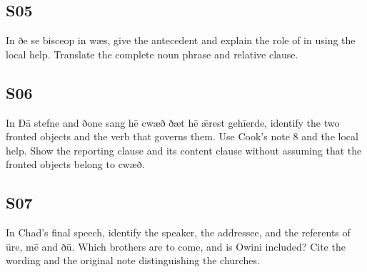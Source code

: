 \par\begin{minipage}{\linewidth}\raggedright
\subsection*{S05}

In ðe se bisceop in wæs, give the antecedent and explain the role of in using the local help. Translate the complete noun phrase and relative clause.

\end{minipage}\par\addvspace{4pt}

\par\begin{minipage}{\linewidth}\raggedright
\subsection*{S06}

In Ðā stefne and ðone sang hē cwæð ðæt hē ǣrest gehīerde, identify the two fronted objects and the verb that governs them. Use Cook’s note 8 and the local help. Show the reporting clause and its content clause without assuming that the fronted objects belong to cwæð.

\end{minipage}\par\addvspace{4pt}

\par\begin{minipage}{\linewidth}\raggedright
\subsection*{S07}

In Chad’s final speech, identify the speaker, the addressee, and the referents of ūre, mē and ðū. Which brothers are to come, and is Owini included? Cite the wording and the original note distinguishing the churches.

\end{minipage}\par\addvspace{4pt}


